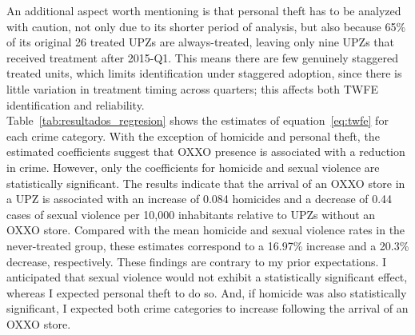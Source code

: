 \documentclass[12pt]{article}
\begin{document}
An additional aspect worth mentioning is that personal theft has to be analyzed with caution, not only due to its shorter period of analysis, but also because 65\% of its original 26 treated UPZs are always-treated, leaving only nine UPZs that received treatment after 2015-Q1. This means there are few genuinely staggered treated units, which limits identification under staggered adoption, since there is little variation in treatment timing across quarters; this affects both TWFE identification and reliability.\\

Table~\ref{tab:resultados_regresion} shows the estimates of equation~\ref{eq:twfe} for each crime category. With the exception of homicide and personal theft, the estimated coefficients suggest that OXXO presence is associated with a reduction in crime. However, only the coefficients for homicide and sexual violence are statistically significant. The results indicate that the arrival of an OXXO store in a UPZ is associated with an increase of 0.084 homicides and a decrease of 0.44 cases of sexual violence per 10,000 inhabitants relative to UPZs without an OXXO store. Compared with the mean homicide and sexual violence rates in the never-treated group, these estimates correspond to a 16.97\% increase and a 20.3\% decrease, respectively. These findings are contrary to my prior expectations. I anticipated that sexual violence would not exhibit a statistically significant effect, whereas I expected personal theft to do so. And, if homicide was also statistically significant, I expected both crime categories to increase following the arrival of an OXXO store.\\
\end{document}
